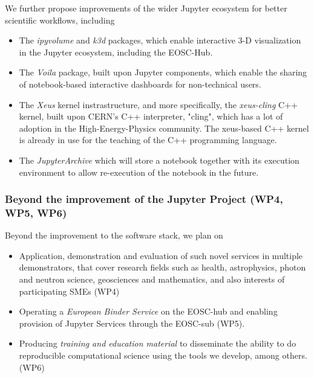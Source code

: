 We further propose improvements of the wider Jupyter ecosystem for
better scientific workflows, including
\begin{itemize}
\item The \emph{ipyvolume} and \emph{k3d} packages, which enable interactive
3-D visualization in the Jupyter ecosystem, including the EOSC-Hub.
\item The \emph{Voila} package, built upon Jupyter components, which enable the
sharing of notebook-based interactive dashboards for non-technical users.
\item The \emph{Xeus} kernel instrastructure, and more specifically,
  the \emph{xeus-cling} C++ kernel, built upon CERN's C++ interpreter,
  "cling", which has a lot of adoption in the High-Energy-Physics
  community. The xeus-based C++ kernel is already in use for the
  teaching of the C++ programming language.
\item The \emph{JupyterArchive} which will store a notebook together
  with its execution environment to allow re-execution of the notebook
  in the future.
\end{itemize}

\subsubsection{Beyond the improvement of the Jupyter Project (WP4,
  WP5, WP6)}
Beyond the improvement to the software stack, we plan on
\begin{itemize}
\item Application, demonstration and evaluation of such novel services
  in multiple demonstrators, that cover research fields such as
  health, astrophysics, photon and neutron science, geosciences and
  mathematics, and also interests of participating SMEs (WP4)
\item Operating a \emph{European Binder Service} on the EOSC-hub and
  enabling provision of Jupyter Services through the EOSC-sub (WP5).
\item Producing \emph{training and education material} to disseminate
  the ability to do reproducible computational science using the tools
  we develop, among others. (WP6)
\end{itemize}


\clearpage

